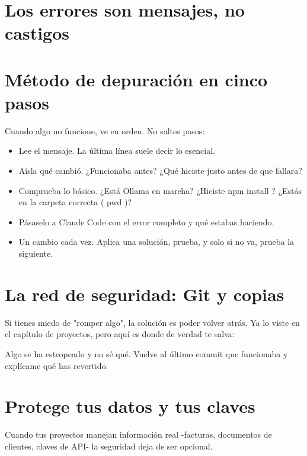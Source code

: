 \documentclass[11pt,a4paper]{book}
\begin{document}
\section{Los errores son mensajes, no castigos}
\section{Método de depuración en cinco pasos}
Cuando algo no funcione, ve en orden. No saltes pasos:

\begin{itemize}\item Lee el mensaje. La última línea suele decir lo esencial.\end{itemize}
\begin{itemize}\item Aísla qué cambió. ¿Funcionaba antes? ¿Qué hiciste justo antes de que fallara?\end{itemize}
\begin{itemize}\item Comprueba lo básico. ¿Está Ollama en marcha? ¿Hiciste npm install ? ¿Estás en la carpeta correcta ( pwd )?\end{itemize}
\begin{itemize}\item Pásaselo a Claude Code con el error completo y qué estabas haciendo.\end{itemize}
\begin{itemize}\item Un cambio cada vez. Aplica una solución, prueba, y solo si no va, prueba la siguiente.\end{itemize}
\section{La red de seguridad: Git y copias}
Si tienes miedo de "romper algo", la solución es poder volver atrás. Ya lo viste en el capítulo de proyectos, pero aquí es donde de verdad te salva:

\begin{codebox}
Algo se ha estropeado y no sé qué. Vuelve al último commit que funcionaba y explícame qué has revertido.
\end{codebox}
\section{Protege tus datos y tus claves}
Cuando tus proyectos manejan información real -facturas, documentos de clientes, claves de API- la seguridad deja de ser opcional.
\end{document}
